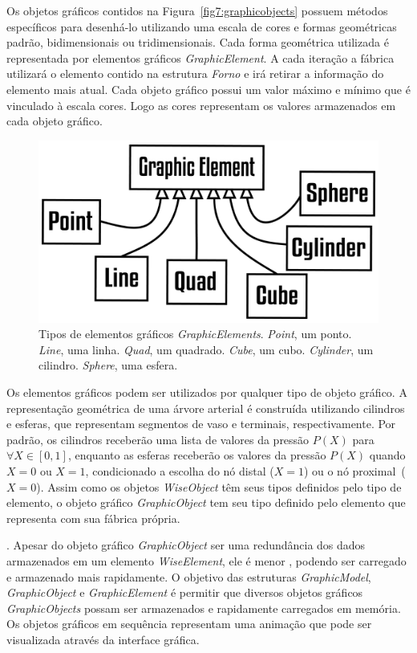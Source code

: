 Os objetos gráficos contidos na Figura~\ref{fig7:graphicobjects} possuem métodos específicos para desenhá-lo utilizando uma escala de cores e formas geométricas padrão, bidimensionais ou tridimensionais. Cada forma geométrica utilizada é representada por elementos gráficos \textit{GraphicElement}. A cada iteração a fábrica utilizará o elemento contido na estrutura \textit{Forno} e irá retirar a informação do elemento mais atual. Cada objeto gráfico possui um valor máximo e mínimo que é vinculado à escala cores. Logo as cores representam os valores armazenados em cada objeto gráfico.

\begin{figure}[!htbp]
	\centering
	\includegraphics[scale=2]{Figures/GraphicElements@16x.png}
	\caption{Tipos de elementos gráficos \textit{GraphicElements}. \textit{Point}, um ponto. \textit{Line}, uma linha. \textit{Quad}, um quadrado. \textit{Cube}, um cubo. \textit{Cylinder}, um cilindro. \textit{Sphere}, uma esfera.}
	\label{fig7:graphicelements}
\end{figure}

Os elementos gráficos podem ser utilizados por qualquer tipo de objeto gráfico. A representação geométrica de uma árvore arterial é construída utilizando cilindros e esferas, que representam segmentos de vaso e terminais, respectivamente. Por padrão, os cilindros receberão uma lista de valores da pressão $P(X)$ para $\forall X \in [0,1]$, enquanto as esferas receberão os valores da pressão $P(X)$ quando $X=0$ ou $X=1$, condicionado a escolha do nó distal ($X=1$) ou o nó proximal~($X=0$).  Assim como os objetos \textit{WiseObject} têm seus tipos definidos pelo tipo de elemento, o objeto gráfico \textit{GraphicObject} tem seu tipo definido pelo elemento que representa com sua fábrica própria.

. Apesar do objeto gráfico \textit{GraphicObject} ser uma redundância dos dados armazenados em um elemento \textit{WiseElement}, ele é menor , podendo ser carregado e armazenado mais rapidamente. O objetivo das estruturas \textit{GraphicModel}, \textit{GraphicObject} e \textit{GraphicElement} é permitir que diversos objetos gráficos \textit{GraphicObjects} possam ser armazenados  e rapidamente carregados em memória. Os objetos gráficos em sequência representam uma animação que pode ser visualizada através da interface gráfica. 


